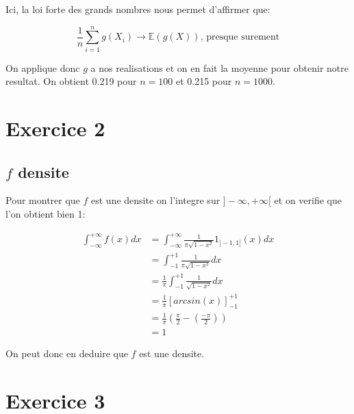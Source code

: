 \documentclass{article}
\begin{document}
\begin{multicols}{2}
Ici, la loi forte des grands nombres nous permet d'affirmer que:

\begin{equation}
    \frac{1}{n} \sum_{i = 1}^n g(X_i) \to \mathbb{E}(g(X)) \text{, presque surement}
\end{equation}

On applique donc $g$ a nos realisations et on en fait la moyenne pour obtenir
notre resultat. On obtient 0.219 pour $n = 100$ et 0.215 pour $n = 1000$.


\section{Exercice 2}\label{sec:ex2}

\subsection{$f$ densite}\label{subsec:ex21}

Pour montrer que $f$ est une densite on l'integre sur $]-\infty, +\infty[$ et on
verifie que l'on obtient bien 1:

\begin{equation}
    \begin{split}
        \int_{-\infty}^{+\infty} f(x) dx
        &= \int_{-\infty}^{+\infty} \frac{1}{\pi \sqrt{1 - x^2}} 1_{]-1, 1[}(x) dx \\
        &= \int_{-1}^{+1} \frac{1}{\pi \sqrt{1 - x^2}} dx \\
        &= \frac{1}{\pi} \int_{-1}^{+1} \frac{1}{\sqrt{1 - x^2}} dx \\
        &= \frac{1}{\pi} [arcsin(x)]_{-1}^{+1} \\
        &= \frac{1}{\pi} \left(\frac{\pi}{2} - \left(\frac{-\pi}{2}\right)\right) \\
        &= 1
    \end{split}
\end{equation}

On peut donc en deduire que $f$ est une densite.


\section{Exercice 3}\label{sec:ex3}


\end{multicols}
\end{document}
